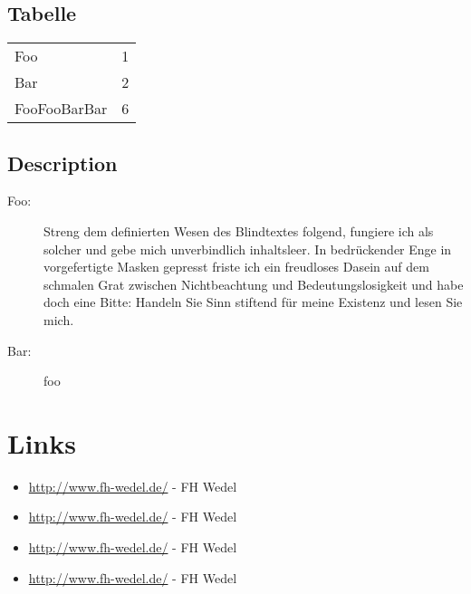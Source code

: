 \documentclass[a4paper,parskip=half,oneside]{scrbook}
\begin{document}
\section{Tabelle}
\begin{tabular}{l r}
Foo  & 1 \\
Bar & 2 \\
FooFooBarBar  & 6 \\
\end{tabular}\section{Description}\begin{description}
    \item [Foo:]  Streng dem definierten Wesen des Blindtextes folgend, fungiere ich als solcher und gebe mich unverbindlich inhaltsleer. In bedrückender Enge in vorgefertigte Masken gepresst friste ich ein freudloses Dasein auf dem schmalen Grat zwischen Nichtbeachtung und Bedeutungslosigkeit und habe doch eine Bitte: Handeln Sie Sinn stiftend für meine Existenz und lesen Sie mich.
    \item [Bar:] foo
  \end{description}


\chapter{Links}

\begin{itemize}
  \item \url{http://www.fh-wedel.de/} - FH Wedel
  \item \url{http://www.fh-wedel.de/} - FH Wedel
  \item \url{http://www.fh-wedel.de/} - FH Wedel
  \item \url{http://www.fh-wedel.de/} - FH Wedel
\end{itemize}
\end{document}
